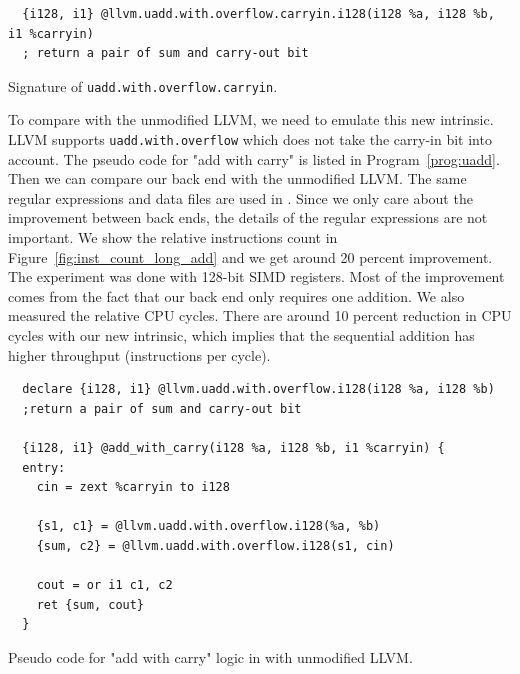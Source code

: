 \begin{program}[htbp!]
\begin{verbatim}
  {i128, i1} @llvm.uadd.with.overflow.carryin.i128(i128 %a, i128 %b, i1 %carryin)
  ; return a pair of sum and carry-out bit
\end{verbatim}
\caption[Signature of {\tt uadd.with.overflow.carryin}]{Signature of {\tt uadd.with.overflow.carryin}.}
\label{prog:uadd_carryin}
\end{program}

To compare with the unmodified LLVM, we need to emulate this new intrinsic. LLVM supports {\tt uadd.with.overflow} which does not take the carry-in bit into account. The pseudo code for "add with carry" is listed in Program~\ref{prog:uadd}. Then we can compare our back end with the unmodified LLVM\@. The same regular expressions and data files are used in \cite{rob_regex}. Since we only care about the improvement between back ends, the details of the regular expressions are not important. We show the relative instructions count in Figure~\ref{fig:inst_count_long_add} and we get around 20 percent improvement. The experiment was done with 128-bit SIMD registers. Most of the improvement comes from the fact that our back end only requires one addition. We also measured the relative CPU cycles. There are around 10 percent reduction in CPU cycles with our new intrinsic, which implies that the sequential addition has higher throughput (instructions per cycle).

\begin{program}[htbp!]
\begin{verbatim}
  declare {i128, i1} @llvm.uadd.with.overflow.i128(i128 %a, i128 %b)
  ;return a pair of sum and carry-out bit

  {i128, i1} @add_with_carry(i128 %a, i128 %b, i1 %carryin) {
  entry:
    cin = zext %carryin to i128

    {s1, c1} = @llvm.uadd.with.overflow.i128(%a, %b)
    {sum, c2} = @llvm.uadd.with.overflow.i128(s1, cin)

    cout = or i1 c1, c2
    ret {sum, cout}
  }
\end{verbatim}
\caption[Pseudo code for "add with carry" logic in with unmodified LLVM]{Pseudo code for "add with carry" logic in with unmodified LLVM\@.}
\label{prog:uadd}
\end{program}

